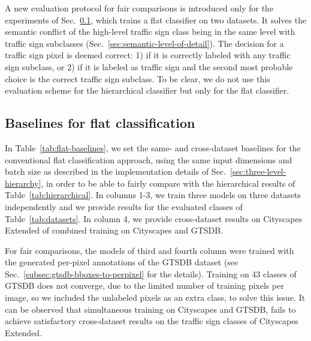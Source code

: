 \documentclass[letterpaper, 10 pt, conference]{ieeeconf}
\begin{document}
A new evaluation protocol for fair comparisons is introduced only for the experiments of Sec.~\ref{sec:baselines}, which trains a flat classifier on two datasets. It solves the semantic conflict of the high-level traffic sign class being in the same level with traffic sign subclasses (Sec.~\ref{sec:semantic-level-of-detail}). The decision for a traffic sign pixel is deemed correct: 1) if it is correctly labeled with any traffic sign subclass, or 2) if it is labeled as traffic sign and the second most probable choice is the correct traffic sign subclass. To be clear, we do not use this evaluation scheme for the hierarchical classifier but only for the flat classifier.

\subsection{Baselines for flat classification}
\label{sec:baselines}
In Table~\ref{tab:flat-baselines}, we set the same- and cross-dataset baselines for the conventional flat classification approach, using the same input dimensions and batch size as described in the implementation details of Sec.~\ref{sec:three-level-hierarchy}, in order to be able to fairly compare with the hierarchical results of Table~\ref{tab:hierarchical}. In columns 1-3, we train three models on three datasets independently and we provide results for the evaluated classes of Table~\ref{tab:datasets}. In column 4, we provide cross-dataset results on Cityscapes Extended of combined training on Cityscapes and GTSDB.

For fair comparisons, the models of third and fourth column were trained with the generated per-pixel annotations of the GTSDB dataset (see Sec.~\ref{subsec:gtsdb-bboxes-to-perpixel} for the details). Training on 43 classes of GTSDB does not converge, due to the limited number of training pixels per image, so we included the unlabeled pixels as an extra class, to solve this issue. It can be observed that simultaneous training on Cityscapes and GTSDB, fails to achieve satisfactory cross-dataset results on the traffic sign classes of Cityscapes Extended.
\end{document}
